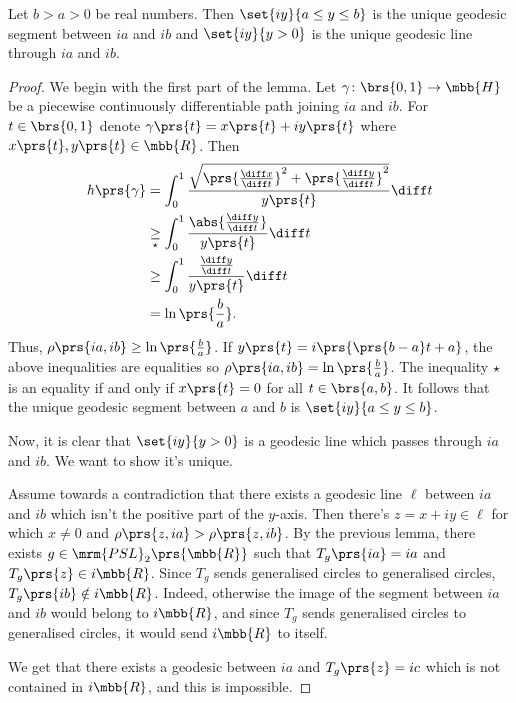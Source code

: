 \documentclass[10pt, twoside]{book}
\begin{document}
\begin{lemma}
Let $b > a > 0$ be real numbers. Then $\set{iy}{a \leq y \leq b}$ is the unique geodesic segment between $ia$ and $ib$ and $\set{iy}{y > 0}$ is the unique geodesic line through $ia$ and $ib$.
\end{lemma}

\begin{proof}
We begin with the first part of the lemma.
Let $\gamma \colon \brs{0,1} \to \mbb{H}$ be a piecewise continuously differentiable path joining $ia$ and $ib$. For $t \in \brs{0,1}$ denote $\gamma\prs{t} = x\prs{t} + iy\prs{t}$ where $x\prs{t},y\prs{t} \in \mbb{R}$.
Then
\begin{align*}
h\prs{\gamma} &= \int_0^1 \frac{\sqrt{\prs{\frac{\diff x}{\diff t}}^2 + \prs{\frac{\diff y}{\diff t}}^2}}{y\prs{t}} \diff t
\\&\underset{\star}{\geq}
\int_0^1 \frac{\abs{\frac{\diff y}{\diff t}}}{y\prs{t}} \diff t
\\&\geq
\int_0^1 \frac{\frac{\diff y}{\diff t}}{y\prs{t}} \diff t
\\&=
\ln\prs{\frac{b}{a}} \text{.}
\end{align*}
Thus, $\rho\prs{ia, ib} \geq \ln\prs{\frac{b}{a}}$. If $y\prs{t} = i\prs{\prs{b-a}t + a}$, the above inequalities are equalities so $\rho\prs{ia, ib} = \ln\prs{\frac{b}{a}}$. The inequality $\star$ is an equality if and only if $x\prs{t} = 0$ for all $t \in \brs{a,b}$. It follows that the unique geodesic segment between $a$ and $b$ is $\set{iy}{a \leq y \leq b}$.

Now, it is clear that $\set{iy}{y > 0}$ is a geodesic line which passes through $ia$ and $ib$.
We want to show it's unique.

Assume towards a contradiction that there exists a geodesic line $\ell$ between $ia$ and $ib$ which isn't the positive part of the $y$-axis.
Then there's $z = x + iy \in \ell$ for which $x \neq 0$ and $\rho\prs{z, ia} > \rho\prs{z, ib}$. By the previous lemma, there exists $g \in \mrm{PSL}_2\prs{\mbb{R}}$ such that $T_g\prs{ia} = ia$ and $T_g\prs{z} \in i \mbb{R}$. Since $T_g$ sends generalised circles to generalised circles, $T_g\prs{ib} \notin i \mbb{R}$. Indeed, otherwise the image of the segment between $ia$ and $ib$ would belong to $i \mbb{R}$, and since $T_g$ sends generalised circles to generalised circles, it would send $i\mbb{R}$ to itself.

We get that there exists a geodesic between $ia$ and $T_g\prs{z} = ic$ which is not contained in $i\mbb{R}$, and this is impossible.
\end{proof}
\end{document}
